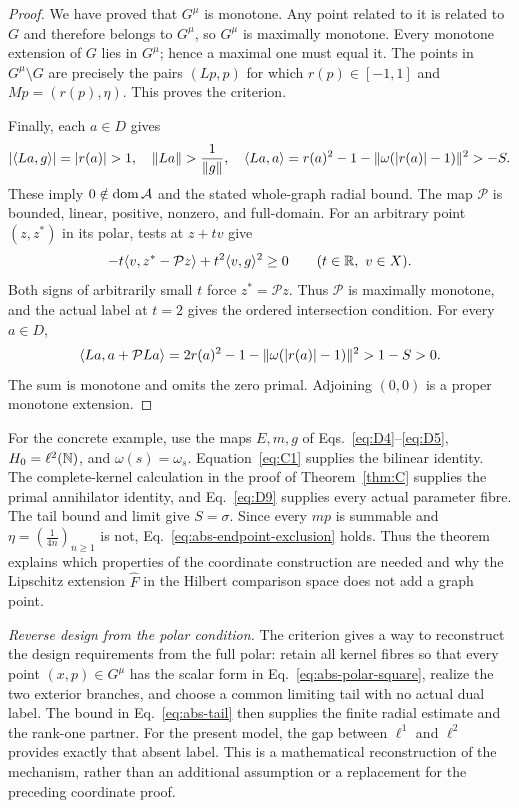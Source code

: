 \begin{proof}
We have proved that $G^\mu$ is monotone. Any point related to it
is related to $G$ and therefore belongs to $G^\mu$, so $G^\mu$
is maximally monotone. Every monotone extension of $G$ lies in
$G^\mu$; hence a maximal one must equal it. The points in
$G^\mu\setminus G$ are precisely the pairs $(Lp,p)$ for which
$r(p)\in[-1,1]$ and $Mp=(r(p),\eta)$. This proves the criterion.

Finally, each $a\in D$ gives
\[
|\pair{La}{g}|=|r(a)|>1,\quad
\|La\|>\frac{1}{\|g\|},\quad
\pair{La}{a}=r(a)^2-1-\|\omega(|r(a)|-1)\|^2>-S.
\]
These imply $0\notin\operatorname{dom}\mathcal A$ and the stated whole-graph radial bound.
The map $\mathcal P$ is bounded, linear, positive, nonzero, and full-domain.
For an arbitrary point $(z,z^*)$ in its polar, tests at $z+tv$ give
\[
-t\langle v,z^*-\mathcal Pz\rangle+t^2\langle v,g\rangle^2\ge0
\qquad(t\in\mathbb R,\ v\in X).
\]
Both signs of arbitrarily small $t$ force $z^*=\mathcal Pz$.
Thus $\mathcal P$ is maximally monotone, and the actual label at
$t=2$ gives the ordered intersection condition. For every $a\in D$,
\[
\langle La,a+\mathcal PLa\rangle
=2r(a)^2-1-\|\omega(|r(a)|-1)\|^2>1-S>0.
\]
The sum is monotone and omits the zero primal. Adjoining $(0,0)$
is a proper monotone extension.
\end{proof}

For the concrete example, use the maps $E,m,g$ of
Eqs.~\eqref{eq:D4}--\eqref{eq:D5}, $H_0=\ell^2(\mathbb N)$, and
$\omega(s)=\omega_s$. Equation~\eqref{eq:C1} supplies the
bilinear identity. The complete-kernel calculation in the proof of
Theorem~\ref{thm:C} supplies the primal annihilator identity,
and Eq.~\eqref{eq:D9} supplies every actual parameter fibre.
The tail bound and limit give $S=\sigma$. Since every $mp$ is
summable and $\eta=(\frac{1}{4n})_{n\ge1}$ is not,
Eq.~\eqref{eq:abs-endpoint-exclusion} holds. Thus the theorem explains which properties of the
coordinate construction are needed and why the Lipschitz extension
$\widehat F$ in the Hilbert comparison space does not add a graph point.

\noindent\textit{Reverse design from the polar condition.}
The criterion gives a way to reconstruct the design requirements from
the full polar: retain all kernel fibres so that every point $(x,p)\in G^\mu$ has
the scalar form in Eq.~\eqref{eq:abs-polar-square}, realize the two
exterior branches, and choose a common limiting tail with no actual
dual label. The bound in Eq.~\eqref{eq:abs-tail} then supplies the
finite radial estimate and the rank-one partner. For the present model,
the gap between $\ell^1$ and $\ell^2$ provides exactly that absent
label. This is a mathematical reconstruction of the mechanism, rather
than an additional assumption or a replacement for the preceding
coordinate proof.



